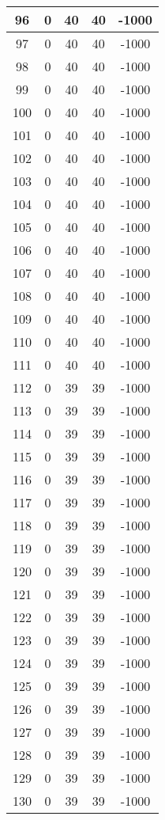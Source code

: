 \documentclass[letterpaper, 12pt]{article}
\begin{document}
\begin{longtable}{|c|c|c|c|c|}
\hline
96 & 0 & 40 & 40 & -1000 \\
\hline
97 & 0 & 40 & 40 & -1000 \\
\hline
98 & 0 & 40 & 40 & -1000 \\
\hline
99 & 0 & 40 & 40 & -1000 \\
\hline
100 & 0 & 40 & 40 & -1000 \\
\hline
101 & 0 & 40 & 40 & -1000 \\
\hline
102 & 0 & 40 & 40 & -1000 \\
\hline
103 & 0 & 40 & 40 & -1000 \\
\hline
104 & 0 & 40 & 40 & -1000 \\
\hline
105 & 0 & 40 & 40 & -1000 \\
\hline
106 & 0 & 40 & 40 & -1000 \\
\hline
107 & 0 & 40 & 40 & -1000 \\
\hline
108 & 0 & 40 & 40 & -1000 \\
\hline
109 & 0 & 40 & 40 & -1000 \\
\hline
110 & 0 & 40 & 40 & -1000 \\
\hline
111 & 0 & 40 & 40 & -1000 \\
\hline
112 & 0 & 39 & 39 & -1000 \\
\hline
113 & 0 & 39 & 39 & -1000 \\
\hline
114 & 0 & 39 & 39 & -1000 \\
\hline
115 & 0 & 39 & 39 & -1000 \\
\hline
116 & 0 & 39 & 39 & -1000 \\
\hline
117 & 0 & 39 & 39 & -1000 \\
\hline
118 & 0 & 39 & 39 & -1000 \\
\hline
119 & 0 & 39 & 39 & -1000 \\
\hline
120 & 0 & 39 & 39 & -1000 \\
\hline
121 & 0 & 39 & 39 & -1000 \\
\hline
122 & 0 & 39 & 39 & -1000 \\
\hline
123 & 0 & 39 & 39 & -1000 \\
\hline
124 & 0 & 39 & 39 & -1000 \\
\hline
125 & 0 & 39 & 39 & -1000 \\
\hline
126 & 0 & 39 & 39 & -1000 \\
\hline
127 & 0 & 39 & 39 & -1000 \\
\hline
128 & 0 & 39 & 39 & -1000 \\
\hline
129 & 0 & 39 & 39 & -1000 \\
\hline
130 & 0 & 39 & 39 & -1000 \\

\end{longtable}
\end{document}
